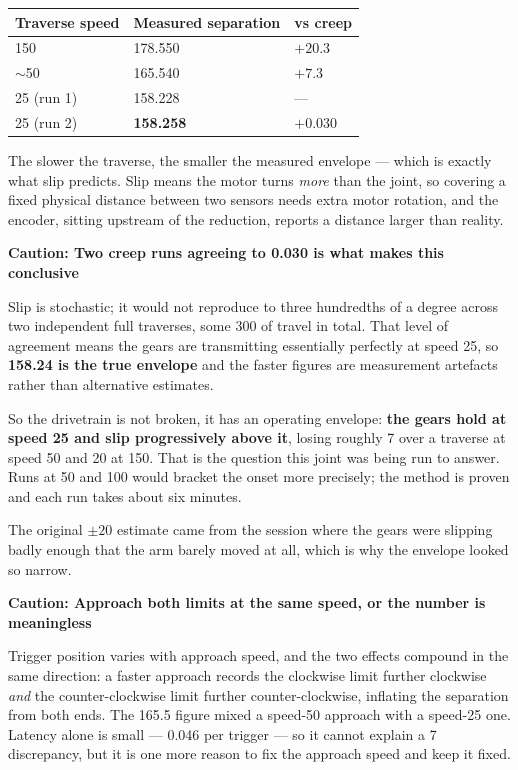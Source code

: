 \documentclass[11pt,letterpaper]{article}
\newenvironment{caution}[1]{%
    \par\addvspace{8pt}%
    \noindent{\color{cautionred}\rule{\linewidth}{0.8pt}}\par\vspace{2pt}
    \noindent\textbf{\color{cautionred}Caution: #1}\par\vspace{2pt}
}{%
    \par\vspace{2pt}\noindent{\color{cautionred}\rule{\linewidth}{0.4pt}}%
    \par\addvspace{8pt}%
}
\begin{document}
\begin{center}
\begin{tabular}{lll}
\toprule
\textbf{Traverse speed} & \textbf{Measured separation} & \textbf{vs creep} \\ \midrule
150            & 178.550\textdegree{} & $+20.3$\textdegree{} \\
$\sim$50       & 165.540\textdegree{} & $+7.3$\textdegree{} \\
25 (run 1)     & 158.228\textdegree{} & --- \\
25 (run 2)     & \textbf{158.258\textdegree{}} & $+0.030$\textdegree{} \\
\bottomrule
\end{tabular}
\end{center}

The slower the traverse, the smaller the measured envelope --- which is exactly
what slip predicts. Slip means the motor turns \emph{more} than the joint, so
covering a fixed physical distance between two sensors needs extra motor
rotation, and the encoder, sitting upstream of the reduction, reports a distance
larger than reality.

\begin{caution}{Two creep runs agreeing to 0.030\textdegree{} is what makes this conclusive}
Slip is stochastic; it would not reproduce to three hundredths of a degree across
two independent full traverses, some 300\textdegree{} of travel in total. That
level of agreement means the gears are transmitting essentially perfectly at
speed 25, so \textbf{158.24\textdegree{} is the true envelope} and the faster
figures are measurement artefacts rather than alternative estimates.
\end{caution}

So the drivetrain is not broken, it has an operating envelope: \textbf{the gears
hold at speed 25 and slip progressively above it}, losing roughly
7\textdegree{} over a traverse at speed 50 and 20\textdegree{} at 150. That is
the question this joint was being run to answer. Runs at 50 and 100 would bracket
the onset more precisely; the method is proven and each run takes about six
minutes.

The original $\pm20$\textdegree{} estimate came from the session where the gears
were slipping badly enough that the arm barely moved at all, which is why the
envelope looked so narrow.

\begin{caution}{Approach both limits at the same speed, or the number is meaningless}
Trigger position varies with approach speed, and the two effects compound in the
same direction: a faster approach records the clockwise limit further clockwise
\emph{and} the counter-clockwise limit further counter-clockwise, inflating the
separation from both ends. The 165.5\textdegree{} figure mixed a speed-50 approach
with a speed-25 one. Latency alone is small --- 0.046\textdegree{} per trigger ---
so it cannot explain a 7\textdegree{} discrepancy, but it is one more reason to
fix the approach speed and keep it fixed.
\end{caution}
\end{document}
